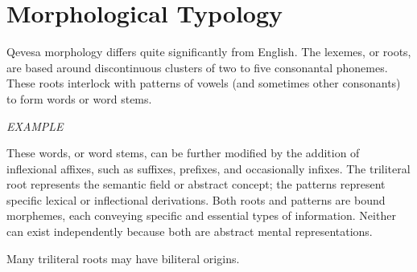\documentclass[grammar]{subfiles}
\begin{document}
  \chapter{Morphological Typology}
  \label{ch:morphological_typology}


  Qevesa morphology differs quite significantly from English.  The lexemes, or
  roots, are based around discontinuous clusters of two to five consonantal
  phonemes.  These roots interlock with patterns of vowels (and sometimes other
  consonants) to form words or word stems.

  \begin{exe}
    \ex \emph{EXAMPLE}
  \end{exe}

  These words, or word stems, can be further modified by the addition of
  inflexional affixes, such as suffixes, prefixes, and occasionally infixes.
  The triliteral root represents the semantic field or abstract concept; the
  patterns represent specific lexical or inflectional derivations.  Both roots
  and patterns are bound morphemes, each conveying specific and essential types
  of information.  Neither can exist independently because both are abstract
  mental representations. 

  Many triliteral roots may have biliteral origins. 
\end{document}
